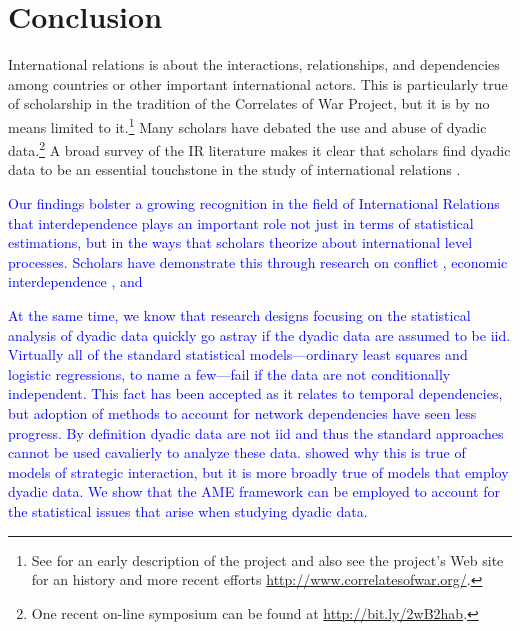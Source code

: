 \section{\textbf{Conclusion}}

International relations is about the interactions, relationships, and dependencies among countries or other important international actors. This is particularly true of scholarship in the tradition of the Correlates of War Project, but it is by no means limited to it.\footnote{See \cite{singer:1972} for an early description of the project and also see the project's Web site for an history and more recent efforts \url{http://www.correlatesofwar.org/}.} Many scholars have debated the use and abuse of dyadic data.\footnote{One recent on-line symposium can be found at \url{http://bit.ly/2wB2hab}.} A broad survey of the IR literature makes it clear that scholars find dyadic data to be an essential touchstone in the study of international relations \citep{erikson:pinto:2014,aronow:etal:2015}. \textcolor{blue}{Our findings bolster a growing recognition in the field of International Relations that interdependence plays an important role not just in terms of statistical estimations, but in the ways that scholars theorize about international level processes. Scholars have demonstrate this through research on conflict \cite{dorff:etal:2020}, economic interdependence \cite{maoz:2009a}, and

At the same time, we know that research designs focusing on the statistical analysis of dyadic data quickly go astray if the dyadic data are assumed to be iid.  Virtually all of the standard statistical models---ordinary least squares and logistic regressions, to name a few---fail if the data are not conditionally independent. This fact has been accepted as it relates to temporal dependencies, but adoption of methods to account for network dependencies have seen less progress. By definition dyadic data are not iid and thus the standard approaches cannot be used cavalierly to analyze these data. \citet{signorino:1999} showed why this is true of models of strategic interaction, but it is more broadly true of models that employ dyadic data.  We show that the AME framework can be employed to account for the statistical issues that arise when studying dyadic data.

}
